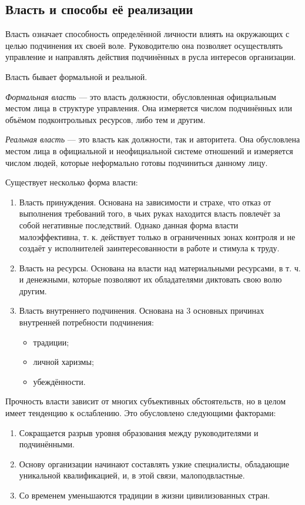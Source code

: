 \documentclass[12pt, russian, oneside, article]{ncc}
\begin{document}
\subsection{Власть и способы её реализации}
\label{sec-3_2}


Власть означает способность определённой личности влиять на окружающих с целью подчинения их своей воле. Руководителю она позволяет осуществлять управление и направлять действия подчинённых в русла интересов организации.

Власть бывает формальной и реальной.

\emph{Формальная власть} --- это власть должности, обусловленная официальным местом лица в структуре управления. Она измеряется числом подчинённых или объёмом подконтрольных ресурсов, либо тем и другим.

\emph{Реальная власть} --- это власть как должности, так и авторитета. Она обусловлена местом лица в официальной и неофициальной системе отношений и измеряется числом людей, которые неформально готовы подчиниться данному лицу.

Существует несколько форма власти:
\begin{enumerate}
\item Власть принуждения. Основана на зависимости и страхе, что отказ от выполнения требований того, в чьих руках находится власть повлечёт за собой негативные последствий. Однако данная форма власти малоэффективна, т. к. действует только в ограниченных зонах контроля и не создаёт у исполнителей заинтересованности в работе и стимула к труду.
\item Власть на ресурсы. Основана на власти над материальными ресурсами, в т. ч. и денежными, которые позволяют их обладателями диктовать свою волю другим.
\item Власть внутреннего подчинения. Основана на 3 основных причинах внутренней потребности подчинения:

\begin{itemize}
\item традиции;
\item личной харизмы;
\item убеждённости.
\end{itemize}

\end{enumerate}

Прочность власти зависит от многих субъективных обстоятельств, но в целом имеет тенденцию к ослаблению. Это обусловлено следующими факторами:
\begin{enumerate}
\item Сокращается разрыв уровня образования между руководителями и подчинёнными.
\item Основу организации начинают составлять узкие специалисты, обладающие уникальной квалификацией, и, в этой связи, малоподвластные.
\item Со временем уменьшаются традиции в жизни цивилизованных стран.
\end{enumerate}
\end{document}
